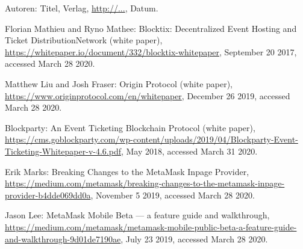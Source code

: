 \begin{thebibliography}{99}

 Autoren: Titel, Verlag, \url{http://...}, Datum.

 Florian Mathieu and Ryno Mathee: Blocktix: Decentralized Event Hosting and Ticket DistributionNetwork (white paper), \url{https://whitepaper.io/document/332/blocktix-whitepaper}, September 20 2017, accessed March 28 2020.


 Matthew Liu and Josh Fraser: Origin Protocol (white paper), \url{https://www.originprotocol.com/en/whitepaper}, December 26 2019, accessed March 28 2020.

 Blockparty: An Event Ticketing Blockchain Protocol (white paper), \url{https://cms.goblockparty.com/wp-content/uploads/2019/04/Blockparty-Event-Ticketing-Whitepaper-v-4.6.pdf}, May 2018, accessed March 31 2020.

 Erik Marks: Breaking Changes to the MetaMask Inpage Provider, \url{https://medium.com/metamask/breaking-changes-to-the-metamask-inpage-provider-b4dde069dd0a}, November 5 2019, accessed March 28 2020.

 Jason Lee: MetaMask Mobile Beta — a feature guide and walkthrough, \url{https://medium.com/metamask/metamask-mobile-public-beta-a-feature-guide-and-walkthrough-9d01de7190ae}, July 23 2019, accessed March 28 2020.




\end{thebibliography}

